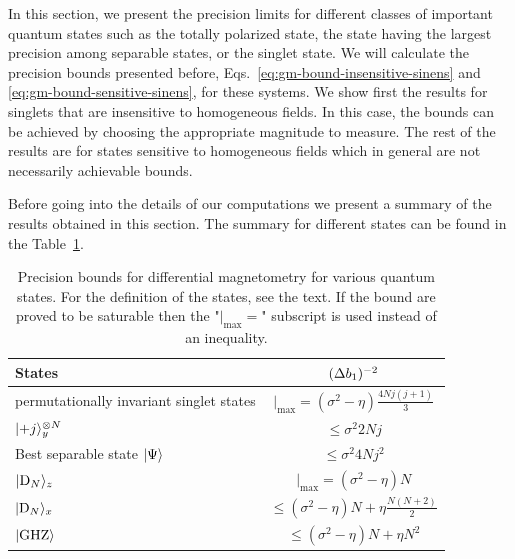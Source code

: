 In this section, we present the precision limits for different classes of important quantum states such as the totally polarized state, the state having the largest precision among separable states, or the singlet state.
We will calculate the precision bounds presented before, Eqs.~\eqref{eq:gm-bound-insensitive-sinens} and \eqref{eq:gm-bound-sensitive-sinens}, for these systems.
We show first the results for singlets that are insensitive to homogeneous
fields.
In this case, the bounds can be achieved by choosing
the appropriate magnitude to measure.
The rest of the results are for states sensitive to homogeneous
fields which in general are not necessarily achievable bounds.

Before going into the details of our computations we present a summary of the results obtained in this section.
The summary for different states can be found in the Table~\ref{tab:compare all the states}.
\begin{table}
  \begin{center}
  \begin{tabular}{|l|c|}
    \hline
    States & $(\Delta b_1 )^{-2}$ \\
    \hline
    permutationally invariant singlet states & $ |_{\max} = (\sigma^2-\eta) \frac{4Nj(j+1)}{3}$ \\
    \hline
    $\vert{+j}\rangle_{y}^{\otimes N}$ & $\leqslant \sigma^2 2Nj$ \\
    \hline
    Best separable state $\vert{\Psi}\rangle$ & $\leqslant \sigma^2 4N j^2$ \\
    \hline
    $\vert{\ensuremath{\textnormal{D}_{N}}}\rangle_{z}$ & $ |_{\max}=(\sigma^2-\eta) N$\\
    \hline
    $\vert{\ensuremath{\textnormal{D}_{N}}}\rangle_{x}$ & $ \leqslant (\sigma^2 -\eta) N + \eta \frac{N(N+2)}{2}$ \\
    \hline
    $\vert{\textnormal{GHZ}}\rangle$ & $\leqslant (\sigma^2 - \eta) N  + \eta N^2$ \\
    \hline
  \end{tabular}
  \end{center}
\caption[Bounds on the precision for different states for a single atomic ensemble.]{
Precision bounds for  differential magnetometry for various quantum states.
For the definition of the states, see the text.
If the bound are proved to be saturable then
the "$|_{\max}=$" subscript is used instead of an inequality.}
\label{tab:compare all the states}
\end{table}


